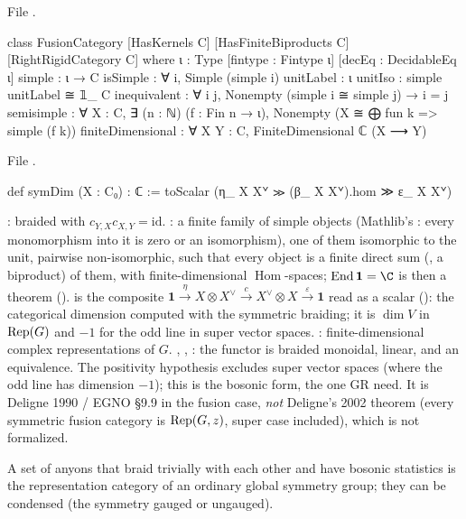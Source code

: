 \noindent File .
\begin{leancode}
class FusionCategory [HasKernels C] [HasFiniteBiproducts C] [RightRigidCategory C] where
  ι : Type
  [fintype : Fintype ι]
  [decEq : DecidableEq ι]
  simple : ι → C
  isSimple : ∀ i, Simple (simple i)
  unitLabel : ι
  unitIso : simple unitLabel ≅ 𝟙_ C
  inequivalent : ∀ i j, Nonempty (simple i ≅ simple j) → i = j
  semisimple : ∀ X : C, ∃ (n : ℕ) (f : Fin n → ι), Nonempty (X ≅ ⨁ fun k => simple (f k))
  finiteDimensional : ∀ X Y : C, FiniteDimensional ℂ (X ⟶ Y)
\end{leancode}
\noindent File .
\begin{leancode}
def symDim (X : C₀) : ℂ := toScalar (η_ X Xᘁ ≫ (β_ X Xᘁ).hom ≫ ε_ X Xᘁ)
\end{leancode}

\begin{dictionary}
: braided with $c_{Y,X}c_{X,Y}=\mathrm{id}$. : a finite family of simple
objects (Mathlib's : every monomorphism into it is zero or an isomorphism), one of them isomorphic to the
unit, pairwise non-isomorphic, such that every object is a finite direct sum (, a biproduct) of them, with
finite-dimensional $\operatorname{Hom}$-spaces; $\operatorname{End}\mathbf 1=\C$ is then a theorem
().  is the composite
$\mathbf 1\xrightarrow{\eta}X\otimes X^\vee\xrightarrow{c}X^\vee\otimes X\xrightarrow{\varepsilon}\mathbf 1$ read as a
scalar (): the categorical dimension computed with the symmetric braiding; it is $\dim V$ in
$\operatorname{Rep}(G)$ and $-1$ for the odd line in super vector spaces.
: finite-dimensional complex representations of $G$. , ,
: the functor is braided monoidal, linear, and an equivalence. The positivity hypothesis excludes super
vector spaces (where the odd line has dimension $-1$); this is the bosonic form, the one GR need. It is Deligne 1990 /
EGNO §9.9 in the fusion case, \emph{not} Deligne's 2002 theorem (every symmetric fusion category is $\operatorname{Rep}(G,z)$,
super case included), which is not formalized.
\end{dictionary}

\begin{physics}
A set of anyons that braid trivially with each other and have bosonic statistics is the representation category of an
ordinary global symmetry group; they can be condensed (the symmetry gauged or ungauged).
\end{physics}


